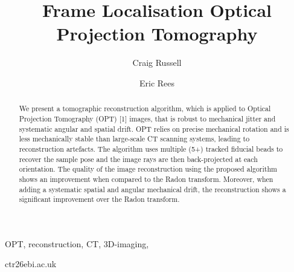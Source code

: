 \documentclass[times, twoside, watermark]{zHenriquesLab-StyleBioRxiv}
\begin{document}
\title{Frame Localisation Optical Projection Tomography}

\author[1,2]{Craig Russell}
\author[1,\Letter]{Eric Rees}



\maketitle

\linenumbers


\begin{keywords}
 OPT, reconstruction, CT, 3D-imaging,
\end{keywords}

\begin{corrauthor}
 ctr26\at ebi.ac.uk
\end{corrauthor}



\begin{abstract}
  We present a tomographic reconstruction algorithm, which is applied to Optical Projection Tomography (OPT) [1] images, that is robust to mechanical jitter and systematic angular and spatial drift.
  OPT relies on precise mechanical rotation and is less mechanically stable than large-scale CT scanning systems, leading to reconstruction artefacts.
  The algorithm uses multiple (5+) tracked fiducial beads to recover the sample pose and the image rays are then back-projected at each orientation.
  The quality of the image reconstruction using the proposed algorithm shows an improvement when compared to the Radon transform.
  Moreover, when adding a systematic spatial and angular mechanical drift, the reconstruction shows a significant improvement over the Radon transform.
\end{abstract}


\end{document}
